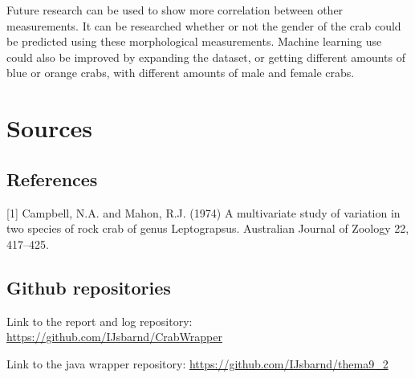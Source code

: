 \documentclass[
]{article}
\begin{document}
Future research can be used to show more correlation between other
measurements. It can be researched whether or not the gender of the crab
could be predicted using these morphological measurements. Machine
learning use could also be improved by expanding the dataset, or getting
different amounts of blue or orange crabs, with different amounts of
male and female crabs.

\newpage

\hypertarget{sources}{%
\section{Sources}\label{sources}}

\hypertarget{references}{%
\subsection{References}\label{references}}

{[}1{]} Campbell, N.A. and Mahon, R.J. (1974) A multivariate study of
variation in two species of rock crab of genus Leptograpsus. Australian
Journal of Zoology 22, 417--425.

\hypertarget{github-repositories}{%
\subsection{Github repositories}\label{github-repositories}}

Link to the report and log repository:
\url{https://github.com/IJsbarnd/CrabWrapper}

Link to the java wrapper repository:
\url{https://github.com/IJsbarnd/thema9_2}
\end{document}
